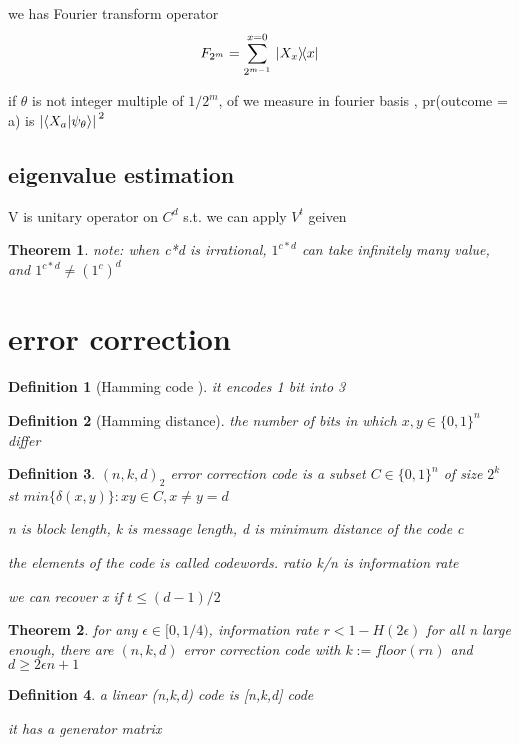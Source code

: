 \documentclass[10pt]{article}
\newcommand{\su}[2]{\sum_{#1}^{#2}}
\theoremstyle{break}
\newtheorem{thm}{Theorem}[subsection]
\newtheorem{defn}{Definition}[subsection]
\begin{document}
        we has Fourier transform operator 
        $$F_{2^m}=\su{2^{m-1}}{x=0} \ketbra*{X_x}{x}$$


        if $\theta$ is not integer multiple of $1/2^m$, of we measure in fourier basis ,
        pr(outcome = a) is $\abs*{\braket{X_a}{\psi_\theta}}^2$

    \subsection{eigenvalue estimation}
        V is unitary operator on $C^d$ s.t. we can apply $V^t$ geiven

        \begin{thm}
            note: when c*d is irrational, $1^{c*d}$ can take infinitely many value, and 
            $1^{c*d}\neq (1^c)^d$
        \end{thm}


    \section{error correction}
    \begin{defn}[Hamming code ]
        it encodes 1 bit into 3
    \end{defn}

    \begin{defn}[Hamming distance]
        the number of bits in which $x,y \in\{0,1\}^n$ differ
        
    \end{defn}

    \begin{defn}
        $(n,k,d)_2$ error correction code is a subset $C\in \{0,1\}^n$ of size $2^k$ st 
        $min\{\delta(x,y)\}:x y \in C, x\neq y=d$

        n is block length, k is message length, d is minimum distance of the code c

        the elements of the code is called codewords. ratio k/n is information rate

        we can recover x if $t\leq (d-1)/2$
    \end{defn}

    \begin{thm}
        for any $\epsilon\in [0,1/4)$, information rate $r<1-H(2\epsilon)$ 
        for all n large enough, there are $(n,k,d)$ error correction code with $k:=floor(rn)$
        and $d\geq 2\epsilon n +1$
    \end{thm}

    \begin{defn}
        a linear (n,k,d) code is [n,k,d] code

        it has a generator matrix
    \end{defn}
\end{document}
